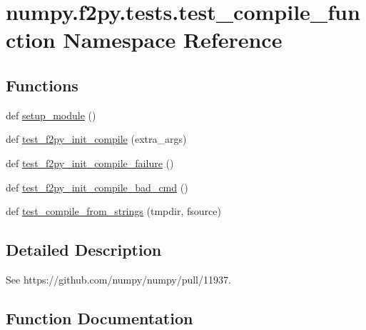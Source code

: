 \hypertarget{namespacenumpy_1_1f2py_1_1tests_1_1test__compile__function}{}\section{numpy.\+f2py.\+tests.\+test\+\_\+compile\+\_\+function Namespace Reference}
\label{namespacenumpy_1_1f2py_1_1tests_1_1test__compile__function}
\subsection*{Functions}
\begin{DoxyCompactItemize}
\item 
def \hyperlink{namespacenumpy_1_1f2py_1_1tests_1_1test__compile__function_ac7eef945bb265a64187f57f2b6e2878b}{setup\+\_\+module} ()
\item 
def \hyperlink{namespacenumpy_1_1f2py_1_1tests_1_1test__compile__function_afdd921cd45994fd96347e9be66f7fbc3}{test\+\_\+f2py\+\_\+init\+\_\+compile} (extra\+\_\+args)
\item 
def \hyperlink{namespacenumpy_1_1f2py_1_1tests_1_1test__compile__function_a9813d350605439e8af278d14f01120c2}{test\+\_\+f2py\+\_\+init\+\_\+compile\+\_\+failure} ()
\item 
def \hyperlink{namespacenumpy_1_1f2py_1_1tests_1_1test__compile__function_a15a395522d8a53a18f4ee42a6958b056}{test\+\_\+f2py\+\_\+init\+\_\+compile\+\_\+bad\+\_\+cmd} ()
\item 
def \hyperlink{namespacenumpy_1_1f2py_1_1tests_1_1test__compile__function_a104934a5b9dcb24efc20d8d126a1ae9d}{test\+\_\+compile\+\_\+from\+\_\+strings} (tmpdir, fsource)
\end{DoxyCompactItemize}


\subsection{Detailed Description}
\begin{DoxyVerb}See https://github.com/numpy/numpy/pull/11937.\end{DoxyVerb}
 

\subsection{Function Documentation}
\mbox{\label{namespacenumpy_1_1f2py_1_1tests_1_1test__compile__function_ac7eef945bb265a64187f57f2b6e2878b}} 

